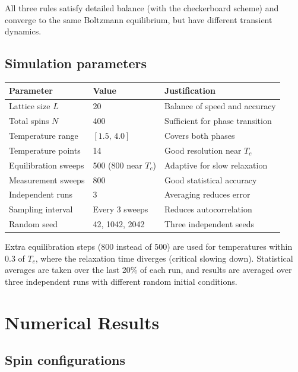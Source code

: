 \documentclass[11pt,a4paper]{article}
\begin{document}
All three rules satisfy detailed balance (with the checkerboard scheme)
and converge to the same Boltzmann equilibrium, but have different
transient dynamics.

\subsection{Simulation parameters}

\begin{center}
\renewcommand{\arraystretch}{1.3}
\begin{tabular}{@{}lll@{}}
\toprule
Parameter & Value & Justification \\
\midrule
Lattice size $L$ & 20 & Balance of speed and accuracy \\
Total spins $N$ & 400 & Sufficient for phase transition \\
Temperature range & $[1.5,\, 4.0]$ & Covers both phases \\
Temperature points & 14 & Good resolution near $T_c$ \\
Equilibration sweeps & 500 (800 near $T_c$) & Adaptive for slow relaxation \\
Measurement sweeps & 800 & Good statistical accuracy \\
Independent runs & 3 & Averaging reduces error \\
Sampling interval & Every 3 sweeps & Reduces autocorrelation \\
Random seed & 42, 1042, 2042 & Three independent seeds \\
\bottomrule
\end{tabular}
\end{center}

Extra equilibration steps (800 instead of 500) are used for temperatures
within 0.3 of $T_c$, where the relaxation time diverges (critical slowing
down). Statistical averages are taken over the last 20\% of each run,
and results are averaged over three independent runs with different random
initial conditions.

\section{Numerical Results}
\label{sec:results}

\subsection{Spin configurations}
\end{document}
